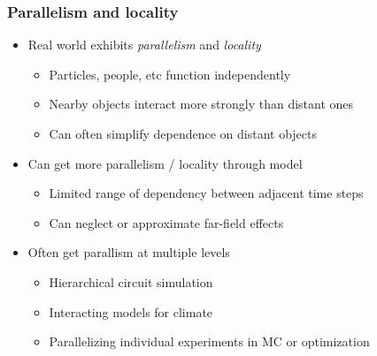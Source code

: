 \documentclass{beamer}
\begin{document}
\begin{frame}
  \frametitle{Parallelism and locality}

  \begin{itemize}
  \item Real world exhibits {\em parallelism} and {\em locality}
    \begin{itemize}
    \item Particles, people, etc function independently
    \item Nearby objects interact more strongly than distant ones
    \item Can often simplify dependence on distant objects
    \end{itemize}
  \item Can get more parallelism / locality through model
    \begin{itemize}
    \item Limited range of dependency between adjacent time steps
    \item Can neglect or approximate far-field effects
    \end{itemize}
  \item Often get parallism at multiple levels
    \begin{itemize}
    \item Hierarchical circuit simulation
    \item Interacting models for climate
    \item Parallelizing individual experiments in MC or optimization
    \end{itemize}
  \end{itemize}
\end{frame}
\end{document}

